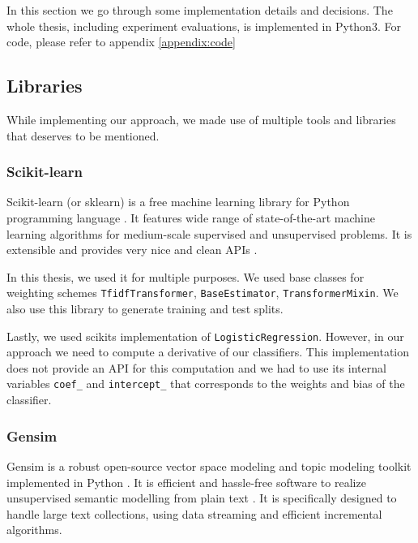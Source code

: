     In this section we go through some implementation details and decisions.
    The whole thesis, including experiment evaluations, is implemented in Python3.
    For code, please refer to appendix \ref{appendix:code}

    \subsection{Libraries} 

    While implementing our approach, we made use of multiple tools and libraries that deserves to be mentioned.

    \subsubsection{Scikit-learn}
    
    Scikit-learn (or sklearn) is a free machine learning library for Python programming language \cite{scikit-learn}.
    It features wide range of state-of-the-art machine learning algorithms for medium-scale supervised and unsupervised problems.
    It is extensible and provides very nice and clean APIs \cite{sklearn_api}.
    
    In this thesis, we used it for multiple purposes.
    We used base classes for weighting schemes \texttt{TfidfTransformer}, \texttt{BaseEstimator}, \texttt{TransformerMixin}.
    We also use this library to generate training and test splits. 
    
    Lastly, we used scikits implementation of \texttt{LogisticRegression}.
    However, in our approach we need to compute a derivative of our classifiers. 
    This implementation does not provide an API for this computation and we had to use
    its internal variables \texttt{coef\_} and \texttt{intercept\_} that corresponds to the weights and bias of the classifier.
    
    \subsubsection{Gensim}
    
    Gensim is a robust open-source vector space modeling and topic modeling toolkit implemented in Python \cite{rehurek_lrec}. 
    It is efficient and hassle-free software to realize unsupervised semantic modelling from plain text \cite{bird2009natural}. %
    It is specifically designed to handle large text collections, using data streaming and efficient incremental algorithms. 
    

